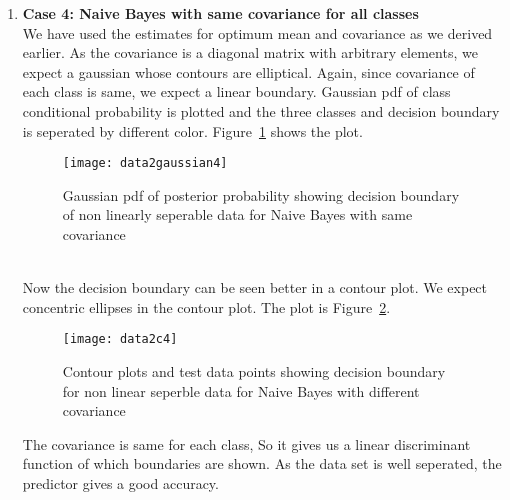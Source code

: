 \documentclass[11pt,paper=a4,answers]{exam}
\begin{document}
\begin{questions}
\begin{enumerate}[i.]
\begin{enumerate}
            \item \textbf{Case 4: Naive Bayes with same covariance for all classes}\\
            We have used the estimates for optimum mean and covariance as we derived earlier. As the covariance is a diagonal matrix with arbitrary elements, we expect a gaussian whose contours are elliptical. Again, since covariance of each class is same, we expect a linear boundary. Gaussian pdf of class conditional probability is plotted and the three classes and decision boundary is seperated by different color. Figure~\ref{fig:data2g4} shows the plot.
            \begin{figure}[ht]
                \centering
                \texttt{[image: data2gaussian4]}
                \vspace{-30pt}
                \caption{Gaussian pdf of posterior probability showing decision boundary of non linearly seperable data for Naive Bayes with same covariance}
                \label{fig:data2g4}
            \end{figure}\\
            Now the decision boundary can be seen better in a contour plot. We expect concentric ellipses in the contour plot. The plot is Figure~\ref{fig:data2c4}.\\ 
            \begin{figure}[ht]
                \centering
                \texttt{[image: data2c4]}
                \vspace{-30pt}
                \caption{Contour plots and test data points showing decision boundary for non linear seperble data for Naive Bayes with different covariance}
                \label{fig:data2c4}
            \end{figure}
            The covariance is same for each class, So it gives us a linear discriminant function of which boundaries are shown. As the data set is well seperated, the predictor gives a good accuracy.


\end{enumerate}
\end{enumerate}
\end{questions}
\end{document}
